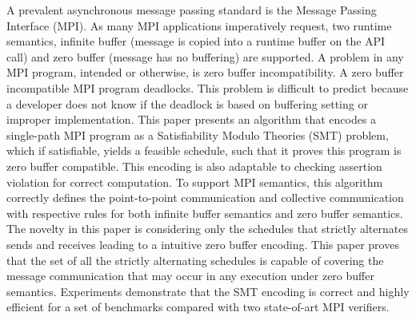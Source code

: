 %
A prevalent asynchronous message passing standard is the Message Passing Interface (MPI). 
%
As many MPI applications imperatively request, two runtime semantics, infinite buffer (message is copied into a runtime buffer on the API call) and zero buffer (message has no buffering) are supported.
%
A problem in any MPI program, intended or otherwise, is zero buffer incompatibility. A zero buffer incompatible MPI program deadlocks.
%
This problem is difficult to predict because a developer does not know if the deadlock is based on buffering setting or improper implementation. 
%
This paper presents an algorithm that encodes a single-path MPI program as a Satisfiability Modulo Theories (SMT) problem, which if satisfiable, yields a feasible schedule, such that it proves this program is zero buffer compatible. This encoding is also adaptable to checking assertion violation for correct computation.
%
To support MPI semantics, this algorithm correctly defines the point-to-point communication and collective communication with respective rules for both infinite buffer semantics and zero buffer semantics. 
%
The novelty in this paper is considering only the schedules that strictly alternates sends and receives leading to a intuitive zero buffer encoding.
%
This paper proves that the set of all the strictly alternating schedules is capable of covering the message communication that may occur in any execution under zero buffer semantics. 
%
%
%
%
%
%
%
%
Experiments demonstrate that the SMT encoding is correct and highly efficient for a set of benchmarks compared with two state-of-art MPI verifiers. 
%

